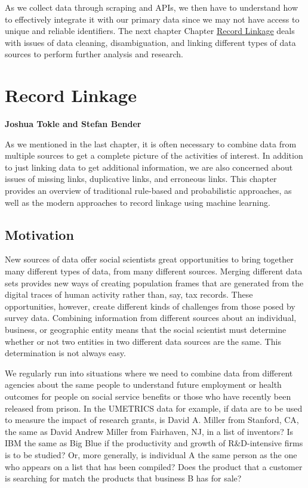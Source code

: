 \documentclass[]{krantz}
\begin{document}
As we collect data through scraping and APIs, we then have to understand
how to effectively integrate it with our primary data since we may not
have access to unique and reliable identifiers. The next chapter Chapter
\protect\hyperlink{chap:link}{Record Linkage} deals with issues of data
cleaning, disambiguation, and linking different types of data sources to
perform further analysis and research.

\hypertarget{chap:link}{\chapter{Record Linkage}\label{chap:link}}

\textbf{Joshua Tokle and Stefan Bender}

As we mentioned in the last chapter, it is often necessary to combine
data from multiple sources to get a complete picture of the activities
of interest. In addition to just linking data to get additional
information, we are also concerned about issues of missing links,
duplicative links, and erroneous links. This chapter provides an
overview of traditional rule-based and probabilistic approaches, as well
as the modern approaches to record linkage using machine learning.

\section{Motivation}\label{motivation}

New sources of data offer social scientists great opportunities to bring
together many different types of data, from many different sources.
Merging different data sets provides new ways of creating population
frames that are generated from the digital traces of human activity
rather than, say, tax records. These opportunities, however, create
different kinds of challenges from those posed by survey data. Combining
information from different sources about an individual, business, or
geographic entity means that the social scientist must determine whether
or not two entities in two different data sources are the same. This
determination is not always easy.

We regularly run into situations where we need to combine data from
different agencies about the same people to understand future employment
or health outcomes for people on social service benefits or those who
have recently been released from prison. In the UMETRICS data for
example, if data are to be used to measure the impact of research
grants, is David A. Miller from Stanford, CA, the same as David Andrew
Miller from Fairhaven, NJ, in a list of inventors? Is IBM the same as
Big Blue if the productivity and growth of R\&D-intensive firms is to be
studied? Or, more generally, is individual A the same person as the one
who appears on a list that has been compiled? Does the product that a
customer is searching for match the products that business B has for
sale?
\end{document}
